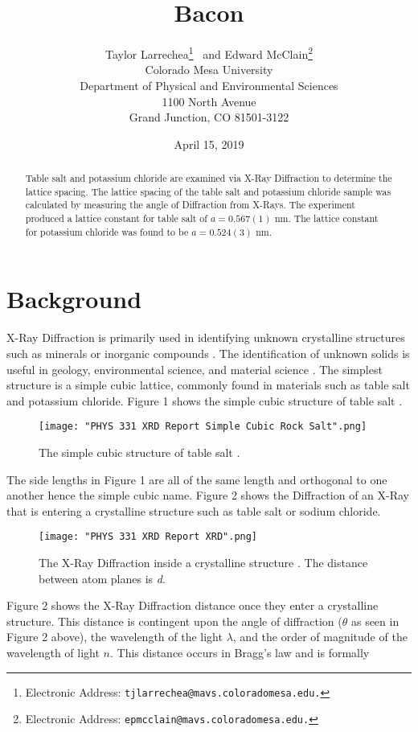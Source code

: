 \documentclass[twocolumn]{article}
\title{\textbf{Bacon}}
\author{Taylor Larrechea\footnote{Electronic Address: \texttt{tjlarrechea@mavs.coloradomesa.edu.}} \ and Edward McClain\footnote{Electronic Address: \texttt{epmcclain@mavs.coloradomesa.edu.}} \\
    Colorado Mesa University \\
    Department of Physical and Environmental Sciences \\
    1100 North Avenue \\
    Grand Junction, CO 81501-3122}
\date{April 15, 2019}
\begin{document}
\maketitle
\begin{abstract}
Table salt and potassium chloride are examined via X-Ray Diffraction to determine the lattice spacing. The lattice spacing of the table salt and potassium chloride sample was calculated by measuring the angle of Diffraction from X-Rays. The experiment produced a lattice constant for table salt of $a=0.567(1)$ nm. The lattice constant for potassium chloride was found to be $a=0.524(3)$ nm. 
\end{abstract}
\section*{Background}
X-Ray Diffraction is primarily used in identifying unknown crystalline structures such as minerals or inorganic compounds \cite{XRDDiffrac}. The identification of unknown solids is useful in geology, environmental science, and material science \cite{Qian}. The simplest structure is a simple cubic lattice, commonly found in materials such as table salt and potassium chloride. Figure 1 shows the simple cubic structure of table salt \cite{Ou}.
\begin{figure}[htbp]
\begin{center}
\texttt{[image: "PHYS 331 XRD Report Simple Cubic Rock Salt".png]}
\caption{The simple cubic structure of table salt \cite{Ou}.}
\label{Fig1}
\end{center}
\end{figure}
\newpage
The side lengths in Figure 1 are all of the same length and orthogonal to one another hence the simple cubic name. Figure 2 shows the Diffraction of an X-Ray that is entering a crystalline structure such as table salt or sodium chloride.
\begin{figure}[htbp]
\begin{center}
\texttt{[image: "PHYS 331 XRD Report XRD".png]}
\caption{The X-Ray Diffraction inside a crystalline structure \cite{X-RayCryst}. The distance between atom planes is \textit{d}.}
\label{Fig2}
\end{center}
\end{figure}
\newpage
Figure 2 shows the X-Ray Diffraction distance once they enter a crystalline structure. This distance is contingent upon the angle of diffraction ($\theta$ as seen in Figure 2 above), the wavelength of the light $\lambda$, and the order of magnitude of the wavelength of light $n$. This distance occurs in Bragg's law and is formally
\end{document}
